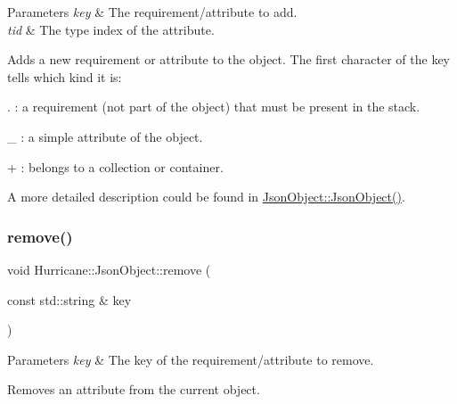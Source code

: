 \begin{DoxyParams}{Parameters}
{\em key} & The requirement/attribute to add. \\
\hline
{\em tid} & The type index of the attribute.\\
\hline
\end{DoxyParams}
Adds a new requirement or attribute to the object. The first character of the key tells which kind it is\+:
\begin{DoxyItemize}
\item {\ttfamily \textquotesingle{}}.\textquotesingle{} \+: a requirement (not part of the object) that must be present in the stack.
\item {\ttfamily \textquotesingle{}\+\_\+\textquotesingle{}} \+: a simple attribute of the object.
\item {\ttfamily \textquotesingle{}+\textquotesingle{}} \+: belongs to a collection or container.
\end{DoxyItemize}

A more detailed description could be found in \mbox{\hyperlink{classHurricane_1_1JsonObject_a57d9c022204b30d4b253c2588f2c1215}{Json\+Object\+::\+Json\+Object()}}. \mbox{\label{classHurricane_1_1JsonObject_a6435e5a8655a6b42b61d55e7fd673c65}} 
\subsubsection{\texorpdfstring{remove()}{remove()}}
{\footnotesize\ttfamily void Hurricane\+::\+Json\+Object\+::remove (\begin{DoxyParamCaption}\item[{const std\+::string \&}]{key }\end{DoxyParamCaption})}


\begin{DoxyParams}{Parameters}
{\em key} & The key of the requirement/attribute to remove.\\
\hline
\end{DoxyParams}
Removes an attribute from the current object. \mbox{\label{classHurricane_1_1JsonObject_af599fb8e2f3aca9c00dc628927367cb8}} 
